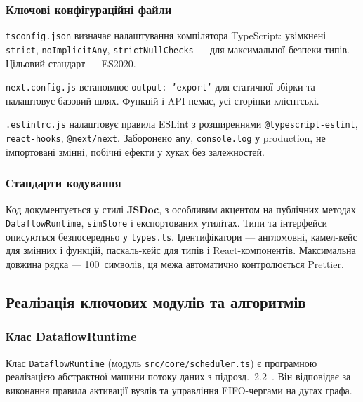 \subsubsection*{Ключові конфігураційні файли}

\texttt{tsconfig.json} визначає налаштування компілятора TypeScript:
увімкнені \texttt{strict}, \texttt{noImplicitAny},
\texttt{strictNullChecks} --- для максимальної безпеки типів.
Цільовий стандарт --- ES2020.

\texttt{next.config.js} встановлює \texttt{output: 'export'} для
статичної збірки та налаштовує базовий шлях. Функцій і API немає,
усі сторінки клієнтські.

\texttt{.eslintrc.js} налаштовує правила ESLint з розширеннями
\texttt{@typescript-eslint}, \texttt{react-hooks},
\texttt{@next/next}. Заборонено \texttt{any}, \texttt{console.log}
у production, не імпортовані змінні, побічні ефекти у хуках
без залежностей.

\subsubsection*{Стандарти кодування}

Код документується у стилі \textbf{JSDoc}, з особливим акцентом
на публічних методах \texttt{DataflowRuntime}, \texttt{simStore} і
експортованих утилітах. Типи та інтерфейси описуються безпосередньо
у \texttt{types.ts}. Ідентифікатори --- англомовні, камел-кейс для
змінних і функцій, паскаль-кейс для типів і React-компонентів.
Максимальна довжина рядка --- 100~символів, ця межа автоматично
контролюється Prettier.


\subsection{Реалізація ключових модулів та алгоритмів}

\subsubsection*{Клас DataflowRuntime}

Клас \texttt{DataflowRuntime} (модуль \texttt{src/core/\allowbreak scheduler.ts})
є програмною реалізацією абстрактної машини потоку даних
з підрозд.~2.2~\cite{veen1986,dennis1975}. Він відповідає за
виконання правила активації вузлів та управління FIFO-чергами
на дугах графа.

